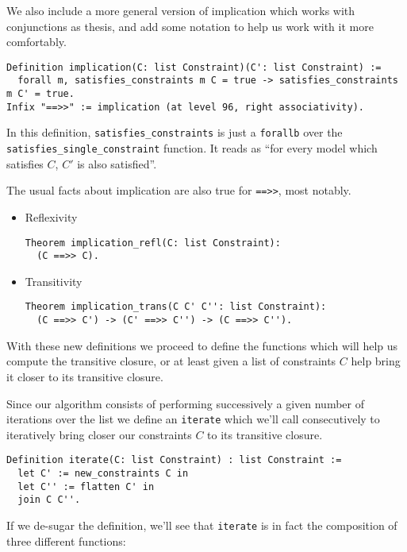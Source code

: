 We also include a more general version of implication which works with conjunctions as
thesis, and add some notation to help us work with it more comfortably.

\begin{verbatim}
Definition implication(C: list Constraint)(C': list Constraint) :=
  forall m, satisfies_constraints m C = true -> satisfies_constraints m C' = true.
Infix "==>>" := implication (at level 96, right associativity).
\end{verbatim}

In this definition, \texttt{satisfies_constraints} is just a \texttt{forallb}
over the \texttt{satisfies_single_constraint} function. It reads as ``for every model
which satisfies $C$, $C'$ is also satisfied''.

The usual facts about implication are also true for \texttt{==>>}, most notably.

\begin{itemize}
    \item Reflexivity
\begin{verbatim}
Theorem implication_refl(C: list Constraint):
  (C ==>> C).
\end{verbatim}

    \item Transitivity
\begin{verbatim}
Theorem implication_trans(C C' C'': list Constraint):
  (C ==>> C') -> (C' ==>> C'') -> (C ==>> C'').
\end{verbatim}
  
\end{itemize}

With these new definitions we proceed to define the functions which will help us 
compute the transitive closure, or at least given a list of constraints $C$ help bring
it closer to its transitive closure.

Since our algorithm consists of performing successively a given number of iterations
over the list we define an \texttt{iterate} which we'll call consecutively to
iteratively bring closer our constraints $C$ to its transitive closure.

\begin{verbatim}
Definition iterate(C: list Constraint) : list Constraint :=
  let C' := new_constraints C in
  let C'' := flatten C' in
  join C C''.
\end{verbatim}

If we de-sugar the definition, we'll see that \texttt{iterate} is in fact the composition of
three different functions: 

